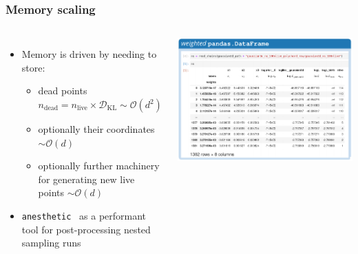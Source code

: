 \documentclass[aspectratio=169]{beamer}
\begin{document}
\begin{frame}
    \frametitle{Memory scaling}
    \begin{columns}
    \begin{itemize}
        \item Memory is driven by needing to store:
            \begin{itemize}
                \item dead points $n_\text{dead}=n_\text{live}\times\mathcal{D}_\text{KL}\sim \mathcal{O}(d^2)$
                \item optionally their coordinates $\sim\mathcal{O}(d)$
                \item optionally further machinery for generating new live points $\sim\mathcal{O}(d)$
            \end{itemize}      
        \item \texttt{anesthetic}~ as a performant tool for post-processing nested sampling runs
    \end{itemize}
        
        \includegraphics[width=\textwidth]{figures/dataframe}
    \end{columns}
\end{frame}
\end{document}
